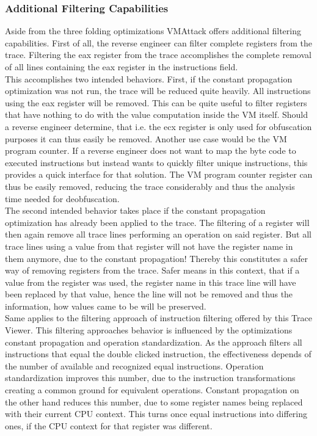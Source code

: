 \documentclass[10pt,twoside,a4paper,bibliography=totoc]{scrbook}
\begin{document}
\subsubsection{Additional Filtering Capabilities}
Aside from the three folding optimizations VMAttack offers additional filtering capabilities.
First of all, the reverse engineer can filter complete registers from the trace. Filtering the eax register from the trace accomplishes the complete removal of all lines containing the eax register in the instructions field.\\
This accomplishes two intended behaviors. First, if the constant propagation optimization was not run, the trace will be reduced quite heavily. All instructions using the eax register will be removed. 
This can be quite useful to filter registers that have nothing to do with the value computation inside the VM itself. Should a reverse engineer determine, that i.e. the ecx register is only used for obfuscation purposes it can thus easily be removed.
Another use case would be the VM program counter. If a reverse engineer does not want to map the byte code to executed instructions but instead wants to quickly filter unique instructions, this provides a quick interface for that solution. 
The VM program counter register can thus be easily removed, reducing the trace considerably and thus the analysis time needed for deobfuscation. \\
The second intended behavior takes place if the constant propagation optimization has already been applied to the trace. 
The filtering of a register will then again remove all trace lines performing an operation on said register. But all trace lines using a value from that register will not have the register name in them anymore, due to the constant propagation! 
Thereby this constitutes a safer way of removing registers from the trace. 
Safer means in this context, that if a value from the register was used, the register name in this trace line will have been replaced by that value, hence the line will not be removed and thus the information, how values came to be will be preserved.\\
Same applies to the filtering approach of instruction filtering offered by this Trace Viewer. This filtering approaches behavior is influenced by the optimizations constant propagation and operation standardization.
As the approach filters all instructions that equal the double clicked instruction, the effectiveness depends of the number of available and recognized equal instructions. 
Operation standardization improves this number, due to the instruction transformations creating a common ground for equivalent operations.
Constant propagation on the other hand reduces this number, due to some register names being replaced with their current CPU context. This turns once equal instructions into differing ones, if the CPU context for that register was different.
\end{document}
